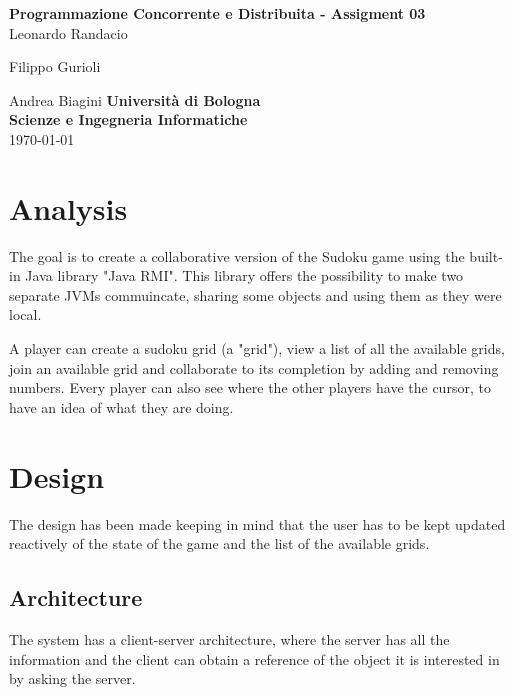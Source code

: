 \documentclass[12pt, a4paper]{report}
\begin{document}
\renewcommand\bibname{References} %


\begin{titlepage}

\begin{center}

\Large \textbf {Programmazione Concorrente e Distribuita - Assigment 03}\\%
\vspace{1em}%
\vfill
Leonardo Randacio


Filippo Gurioli


Andrea Biagini
\vspace{1em}
\vfill
{\bf Università di Bologna \\ Scienze e Ingegneria Informatiche}\\[0.5in]

       
\vfill
\today

\end{center}

\end{titlepage}


\tableofcontents
\listoffigures
\listoftables

\newpage
{} %

\chapter{Analysis}
The goal is to create a collaborative version of the Sudoku game using the 
 built-in Java library "Java RMI". This library offers the possibility to
 make two separate JVMs commuincate, sharing some objects and using them as
 they were local.

A player can create a sudoku grid (a "grid"), view a list of all the
 available grids, join an available grid and collaborate to its completion
 by adding and removing numbers. Every player can also see where the other
 players have the cursor, to have an idea of what they are doing.

\chapter{Design}
The design has been made keeping in mind that the user has to be kept updated
 reactively of the state of the game and the list of the available grids.

\section{Architecture}
The system has a client-server architecture, where the server has all the
 information and the client can obtain a reference of the object it is
 interested in by asking the server.
\end{document}
